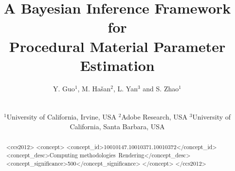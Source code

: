 \documentclass{egpubl}
\title[A Bayesian Inference Framework for Procedural Material Parameter Estimation]%
{A Bayesian Inference Framework for \\ Procedural Material Parameter Estimation\\[-0.5cm]}
\author[Y. Guo, M. Ha\v{s}an, L. Yan \& S. Zhao]
{\parbox{\textwidth}{\centering 
		Y. Guo$^1$\orcid{0000-0002-3420-6619}, 
		M. Ha\v{s}an$^2$\orcid{0000-0003-3808-6092},
		L. Yan$^3$ and 
		S. Zhao$^1$\orcid{0000-0003-4759-0514}
		}
	\\
	{\parbox{\textwidth}{\centering
		$^1$University of California, Irvine, USA \hspace{0.2in}
		$^2$Adobe Research, USA \hspace{0.2in}
		$^3$University of California, Santa Barbara, USA	
		}
	}
}
\begin{document}
 	
	\maketitle
	\begin{abstract}
		
		\begin{CCSXML}
			<ccs2012>
			<concept>
			<concept_id>10010147.10010371.10010372</concept_id>
			<concept_desc>Computing methodologies~Rendering</concept_desc>
			<concept_significance>500</concept_significance>
			</concept>
			</ccs2012>
		\end{CCSXML}
		
	
		\printccsdesc 
	\end{abstract}
	
	
	
	
	
	
	
	
	

\end{document}
